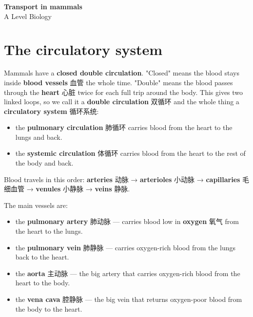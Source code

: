 \documentclass[11pt]{article}
\begin{document}
\begin{center}
  {\LARGE\bfseries Transport in mammals}\\[0.35em]
  {\large A Level Biology}
\end{center}
\vspace{0.6em}

\section*{The circulatory system}

Mammals have a \textbf{closed double circulation}. "Closed" means the blood stays inside \textbf{blood vessels} 血管 the whole time. "Double" means the blood passes through the \textbf{heart} 心脏 twice for each full trip around the body. This gives two linked loops, so we call it a \textbf{double circulation} 双循环 and the whole thing a \textbf{circulatory system} 循环系统:

\begin{itemize}
\item the \textbf{pulmonary circulation} 肺循环 carries blood from the heart to the lungs and back.

\item the \textbf{systemic circulation} 体循环 carries blood from the heart to the rest of the body and back.

\end{itemize}

Blood travels in this order: \textbf{arteries} 动脉 → \textbf{arterioles} 小动脉 → \textbf{capillaries} 毛细血管 → \textbf{venules} 小静脉 → \textbf{veins} 静脉.

The main vessels are:

\begin{itemize}
\item the \textbf{pulmonary artery} 肺动脉 — carries blood low in \textbf{oxygen} 氧气 from the heart to the lungs.

\item the \textbf{pulmonary vein} 肺静脉 — carries oxygen-rich blood from the lungs back to the heart.

\item the \textbf{aorta} 主动脉 — the big artery that carries oxygen-rich blood from the heart to the body.

\item the \textbf{vena cava} 腔静脉 — the big vein that returns oxygen-poor blood from the body to the heart.

\end{itemize}
\end{document}

